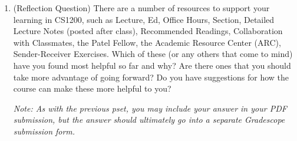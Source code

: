 \documentclass[11pt]{article}
\begin{document}
\begin{enumerate}
\begin{enumerate}
          
        \end{enumerate}

\item (Reflection Question)  There are a number of resources to support your learning in CS1200, such as Lecture, Ed, Office Hours, Section, Detailed Lecture Notes (posted after class), Recommended Readings, Collaboration with Classmates, the Patel Fellow, the Academic Resource Center (ARC), Sender-Receiver Exercises.  Which of these (or any others that come to mind) have you found most helpful so far and why?  Are there ones that you should take more advantage of going forward?  Do you have suggestions for how the course can make these more helpful to you?

\textit{Note: As with the previous pset, you may include your answer in your PDF submission, but the answer should ultimately go into a separate Gradescope submission form.}
\end{enumerate}
\end{document}
